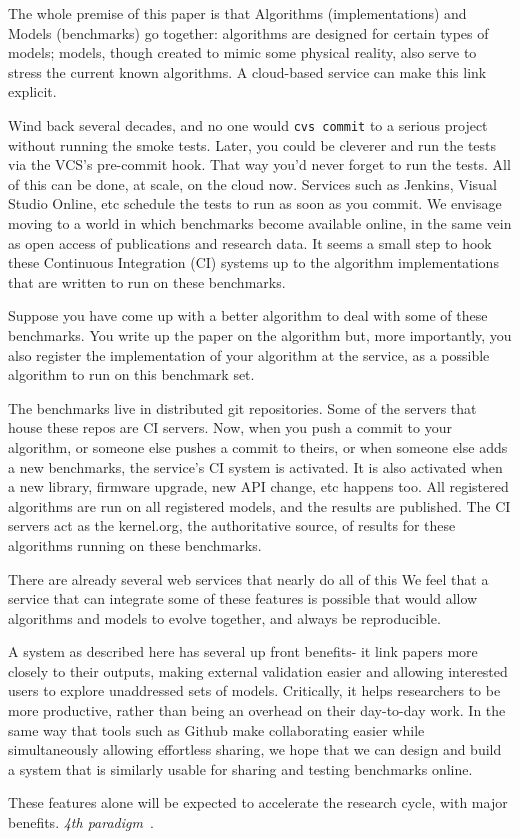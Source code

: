 \documentclass[conference]{IEEEtran}
\begin{document}

The whole premise of this paper is that Algorithms (implementations)
and Models (benchmarks) go together: algorithms are designed for
certain types of models; models, though created to mimic some physical
reality, also serve to stress the current known algorithms. A
cloud-based service can make this link explicit.

Wind back several decades, and no one would {\texttt{cvs commit}} to a
serious project without running the smoke tests. Later, you could be
cleverer and run the tests via the VCS's pre-commit hook. That way
you'd never forget to run the tests. All of this can be done, at
scale, on the cloud now. Services such as Jenkins, Visual Studio
Online, etc schedule the tests to run as soon as you commit. We envisage 
moving to a world in which benchmarks become available online, in the 
same vein as open access of publications and research data. It seems a 
small step to hook these Continuous Integration (CI) systems up to the algorithm
implementations that are written to run on these benchmarks.

Suppose you have come up with a better algorithm to deal with some of
these benchmarks. You write up the paper on the algorithm but, more
importantly, you also register the implementation of your algorithm at
the service, as a possible algorithm to run on this benchmark set.

The benchmarks live in distributed git repositories. Some of the
servers that house these repos are CI servers. Now, when you push a
commit to your algorithm, or someone else pushes a commit to theirs,
or when someone else adds a new benchmarks, the service's CI system is
activated. It is also activated when a new library, firmware upgrade,
new API change, etc happens too. All registered algorithms are run on
all registered models, and the results are published. The CI servers
act as the kernel.org, the authoritative source, of results for these
algorithms running on these benchmarks.

There are already several web services that nearly do all of this %
We feel that a service that can integrate some of these features is possible that 
would allow algorithms and models to evolve together, and always
be reproducible.

A system as described here has several up front benefits- it link papers 
more closely to their outputs, making external validation easier and 
allowing interested users to explore unaddressed sets of models. Critically, it helps
researchers to be more productive, rather than being an overhead on their 
day-to-day work. In the same way that tools such as Github  make collaborating 
easier while simultaneously allowing effortless sharing, we hope that we can design
and build a system that is similarly usable for sharing and testing benchmarks online. 


These features alone will be expected to accelerate the research cycle, with
major benefits. \emph{4th paradigm}~\cite{hey:2009}.



\end{document}
